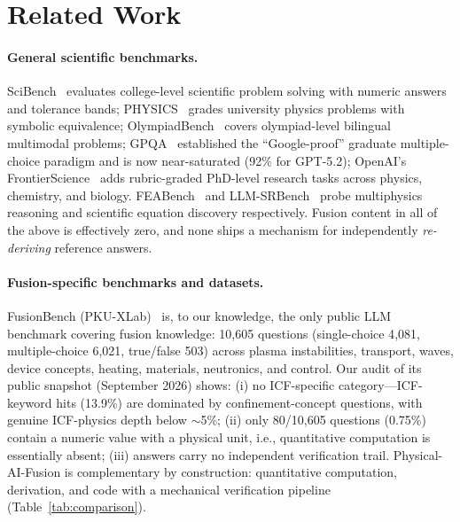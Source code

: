 \section{Related Work}
\label{sec:related}

\paragraph{General scientific benchmarks.}
SciBench~\cite{wang2023scibench} evaluates college-level scientific problem solving with numeric answers and tolerance bands; PHYSICS~\cite{feng2025physics} grades university physics problems with symbolic equivalence; OlympiadBench~\cite{he2024olympiadbench} covers olympiad-level bilingual multimodal problems; GPQA~\cite{rein2023gpqa} established the ``Google-proof'' graduate multiple-choice paradigm and is now near-saturated (92\% for GPT-5.2); OpenAI's FrontierScience~\cite{openai2025frontierscience} adds rubric-graded PhD-level research tasks across physics, chemistry, and biology. FEABench~\cite{feabench2025} and LLM-SRBench~\cite{llmsrbench2025} probe multiphysics reasoning and scientific equation discovery respectively. Fusion content in all of the above is effectively zero, and none ships a mechanism for independently \emph{re-deriving} reference answers.

\paragraph{Fusion-specific benchmarks and datasets.}
FusionBench (PKU-XLab)~\cite{pkufusionbench} is, to our knowledge, the only public LLM benchmark covering fusion knowledge: 10{,}605 questions (single-choice 4{,}081, multiple-choice 6{,}021, true/false 503) across plasma instabilities, transport, waves, device concepts, heating, materials, neutronics, and control. Our audit of its public snapshot (September 2026) shows: (i) no ICF-specific category---ICF-keyword hits (13.9\%) are dominated by confinement-concept questions, with genuine ICF-physics depth below $\sim$5\%; (ii) only 80/10{,}605 questions (0.75\%) contain a numeric value with a physical unit, i.e., quantitative computation is essentially absent; (iii) answers carry no independent verification trail. Physical-AI-Fusion is complementary by construction: quantitative computation, derivation, and code with a mechanical verification pipeline (Table~\ref{tab:comparison}).

